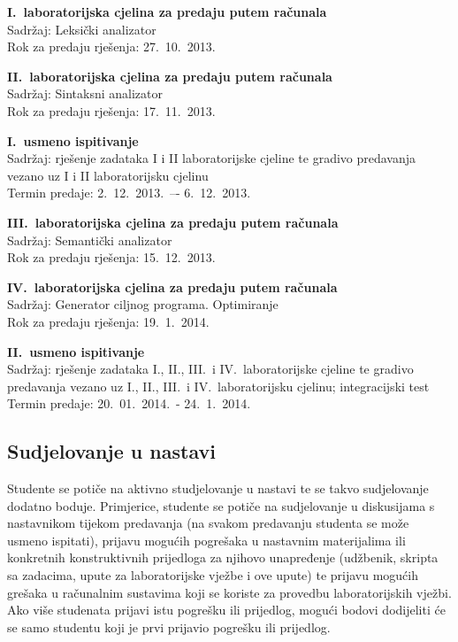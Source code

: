 \documentclass[times, 12pt, utf8]{book}
\begin{document}
\textbf{I.~laboratorijska cjelina za predaju putem računala} \\
Sadržaj: Leksički analizator \\
Rok za predaju rješenja: 27.~10.~2013.

\textbf{II.~laboratorijska cjelina za predaju putem računala} \\
Sadržaj: Sintaksni analizator \\
Rok za predaju rješenja: 17.~11.~2013.

\textbf{I.~usmeno ispitivanje} \\
Sadržaj: rješenje zadataka I i II laboratorijske cjeline te gradivo predavanja vezano uz I i II laboratorijsku cjelinu \\
Termin predaje: 2.~12.~2013.~–- 6.~12.~2013.

\textbf{III.~laboratorijska cjelina za predaju putem računala} \\
Sadržaj: Semantički analizator \\
Rok za predaju rješenja: 15.~12.~2013.

\textbf{IV.~laboratorijska cjelina za predaju putem računala} \\
Sadržaj: Generator ciljnog programa. Optimiranje \\
Rok za predaju rješenja: 19.~1.~2014.

\textbf{II.~usmeno ispitivanje} \\
Sadržaj: rješenje zadataka I., II., III.~i IV.~laboratorijske cjeline te gradivo predavanja vezano uz I., II., III.~i IV.~laboratorijsku cjelinu; integracijski test \\
Termin predaje: 20.~01.~2014.~- 24.~1.~2014.

\cleardoublepage  
{}  
{}
\subsection*{Sudjelovanje u nastavi}

Studente se potiče na aktivno studjelovanje u nastavi te se takvo sudjelovanje dodatno boduje.
Primjerice, studente se potiče na sudjelovanje u diskusijama s nastavnikom tijekom predavanja (na svakom predavanju studenta se može usmeno ispitati), prijavu mogućih pogrešaka u nastavnim materijalima ili konkretnih konstruktivnih prijedloga za njihovo unapređenje (udžbenik, skripta sa zadacima, upute za laboratorijske vježbe i ove upute) te prijavu mogućih grešaka u računalnim sustavima koji se koriste za provedbu laboratorijskih vježbi.
Ako više studenata prijavi istu pogrešku ili prijedlog, mogući bodovi dodijeliti će se samo studentu koji je prvi prijavio pogrešku ili prijedlog.
\end{document}

